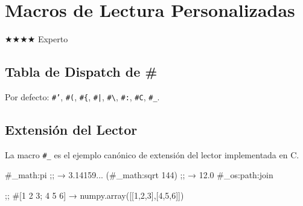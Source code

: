 \chapter{Macros de Lectura Personalizadas}
\label{chap:custom-reader}
{\huge$\bigstar$}{\huge$\bigstar$}{\huge$\bigstar$}{\huge$\bigstar$} Experto

\section{Tabla de Dispatch de \#}
Por defecto: \texttt{\#'}, \texttt{\#(}, \texttt{\#\{}, \texttt{\#|},
\texttt{\#\textbackslash}, \texttt{\#:}, \texttt{\#C}, \texttt{\#\_}.

\section{Extensión del Lector}
La macro \texttt{\#\_} es el ejemplo canónico de extensión del lector
implementada en C.

\begin{lispcode}
\#_math:pi           ;; → 3.14159...
(\#_math:sqrt 144)   ;; → 12.0
\#_os:path:join
\end{lispcode}

\begin{examplebox}[title=DSL conceptual para matrices]
\begin{lispcode}
;; \#[1 2 3; 4 5 6]  →  numpy.array([[1,2,3],[4,5,6]])
\end{lispcode}
\end{examplebox}

